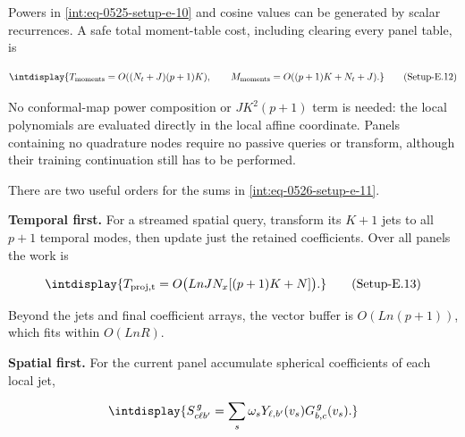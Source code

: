 
Powers in \hyperref[int:eq-setup-e-10]{\eqref{int:eq-0525-setup-e-10}} and cosine values can be generated by scalar recurrences. A safe total moment-table cost, including clearing every panel table, is


\label{int:eq-setup-e-12}
\begingroup\renewcommand{\theHequation}{intdisplay.1013}
\begin{equation}
\intdisplay{
T_{\rm moments}=O((N_t+J)(p+1)K),\qquad
M_{\rm moments}=O((p+1)K+N_t+J).
}
\tag{Setup-E.12}
\label{int:eq-0527-setup-e-12}
\end{equation}
\endgroup


No conformal-map power composition or \(JK^2(p+1)\) term is needed: the local polynomials are evaluated directly in the local affine coordinate. Panels containing no quadrature nodes require no passive queries or transform, although their training continuation still has to be performed.



There are two useful orders for the sums in \hyperref[int:eq-setup-e-11]{\eqref{int:eq-0526-setup-e-11}}.



\textbf{Temporal first.} For a streamed spatial query, transform its \(K+1\) jets to all \(p+1\) temporal modes, then update just the retained coefficients. Over all panels the work is


\label{int:eq-setup-e-13}
\begingroup\renewcommand{\theHequation}{intdisplay.1014}
\begin{equation}
\intdisplay{
T_{\rm proj,t}=O\bigl(LnJN_x[(p+1)K+N]\bigr).
}
\tag{Setup-E.13}
\label{int:eq-0528-setup-e-13}
\end{equation}
\endgroup


Beyond the jets and final coefficient arrays, the vector buffer is \(O(Ln(p+1))\), which fits within \(O(LnR)\).



\textbf{Spatial first.} For the current panel accumulate spherical coefficients of each local jet,


\begingroup\renewcommand{\theHequation}{intdisplay.1015}
\begin{equation*}
\intdisplay{
S_{c\ell b'}^{\,g}=\sum_s\omega_sY_{\ell,b'}(v_s)G_{b,c}^{\,g}(v_s).
}
\end{equation*}
\endgroup

